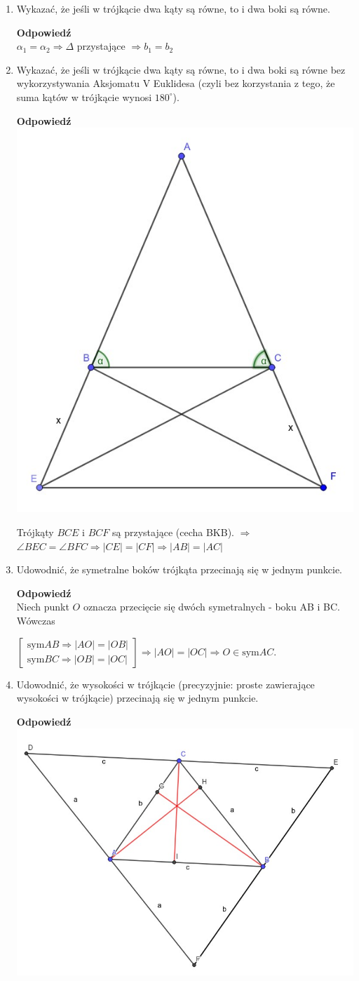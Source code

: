 \documentclass[12pt,a4paper]{article}
\theoremstyle{break}
\newcommand{\Odp}[1]{
		\begin{mdframed}[style=zadanie]
			\textbf{Odpowiedź}\\
			#1
		\end{mdframed}
	}
\begin{document}
\begin{enumerate}[1.]
{		$\Delta ACD$ i $\Delta BCD$ przystające (cecha BBB) $\Rightarrow \alpha_1=\alpha_2\Rightarrow$ trójkąty u góry są przystające (cecha BKB) $\Rightarrow \beta_1=\beta_2$
	}
	\newpage
	\item Wykazać, że jeśli w trójkącie dwa kąty są równe, to i dwa boki są równe.
	\Odp{
		$\alpha_1=\alpha_2\Rightarrow \Delta$ przystające $\Rightarrow b_1=b_2$
	}
	
	\item Wykazać, że jeśli w trójkącie dwa kąty są równe, to i dwa boki są równe bez wykorzystywania Aksjomatu V Euklidesa (czyli bez korzystania z tego, że suma kątów w trójkącie wynosi $180^\circ$).
	\Odp{
		\includegraphics[width=0.4\linewidth]{trj_proof_4.jpeg}
		
		Trójkąty $BCE$ i $BCF$ są przystające (cecha BKB). $\Rightarrow$ $\angle BEC = \angle BFC \Rightarrow |CE| = |CF| \Rightarrow |AB|=|AC|$
	}
	
	\item Udowodnić, że symetralne boków trójkąta przecinają się w jednym punkcie.
	\Odp{
		Niech punkt $O$ oznacza przecięcie się dwóch symetralnych - boku AB i BC. Wówczas
		
		$
		\begin{bmatrix}
			\text{sym} AB \Rightarrow |AO|=|OB|\\
			\text{sym} BC \Rightarrow |OB|=|OC|
		\end{bmatrix} \Rightarrow |AO| = |OC| \Rightarrow O \in \text{sym} AC
		$.
		
	}
	\newpage
	\item Udowodnić, że wysokości w trójkącie (precyzyjnie: proste zawierające wysokości w trójkącie) przecinają się w jednym punkcie.
	\Odp{
		\includegraphics[width=0.6\linewidth]{trj_proof_6.jpeg}
		
}
\end{enumerate}
\end{document}
